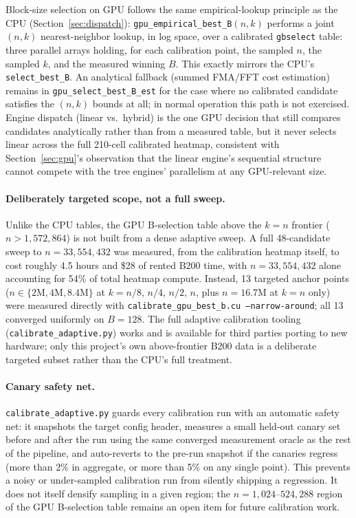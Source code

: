 \documentclass[11pt]{article}
\begin{document}
Block-size selection on GPU follows the same empirical-lookup principle as
the CPU (Section~\ref{sec:dispatch}): \texttt{gpu\_empirical\_best\_B}$(n,k)$
performs a joint $(n,k)$ nearest-neighbor lookup, in log space, over a
calibrated \texttt{gbselect} table: three parallel arrays holding, for each
calibration point, the sampled $n$, the sampled $k$, and the measured
winning $B$. This exactly mirrors the CPU's \texttt{select\_best\_B}. An
analytical fallback (summed FMA/FFT cost estimation) remains in
\texttt{gpu\_select\_best\_B\_est} for the case where no calibrated candidate
satisfies the $(n,k)$ bounds at all; in normal operation this path is not
exercised. Engine dispatch (linear vs.\ hybrid) is the one GPU decision that
still compares candidates analytically rather than from a measured table, but
it never selects linear across the full 210-cell calibrated heatmap,
consistent with Section~\ref{sec:gpu}'s observation that the linear engine's
sequential structure cannot compete with the tree engines' parallelism at any
GPU-relevant size.

\paragraph{Deliberately targeted scope, not a full sweep.}
Unlike the CPU tables, the GPU B-selection table above the $k = n$ frontier
($n > 1{,}572{,}864$) is not built from a dense adaptive sweep. A full
48-candidate sweep to $n = 33{,}554{,}432$ was measured, from the
calibration heatmap itself, to cost roughly 4.5 hours and \$28 of rented
B200 time, with $n = 33{,}554{,}432$ alone accounting for 54\% of total
heatmap compute. Instead, 13 targeted anchor points
($n \in \{2\text{M}, 4\text{M}, 8.4\text{M}\}$ at $k = n/8$, $n/4$, $n/2$,
$n$, plus $n = 16.7\text{M}$ at $k = n$ only) were measured directly with
\texttt{calibrate\_gpu\_best\_b.cu --narrow-around}; all 13 converged
uniformly on $B = 128$. The full adaptive calibration tooling
(\texttt{calibrate\_adaptive.py}) works and is available for third parties
porting to new hardware; only this project's own above-frontier B200 data is
a deliberate targeted subset rather than the CPU's full treatment.

\paragraph{Canary safety net.}
\texttt{calibrate\_adaptive.py} guards every calibration run with an
automatic safety net: it snapshots the target config header, measures a
small held-out canary set before and after the run using the same
converged measurement oracle as the rest of the pipeline, and
auto-reverts to the pre-run snapshot if the canaries regress (more than
2\% in aggregate, or more than 5\% on any single point). This prevents a
noisy or under-sampled calibration run from silently shipping a
regression. It does not itself densify sampling in a given region;
the $n = 1{,}024$--$524{,}288$ region of the GPU B-selection table
remains an open item for future calibration work.
\end{document}
